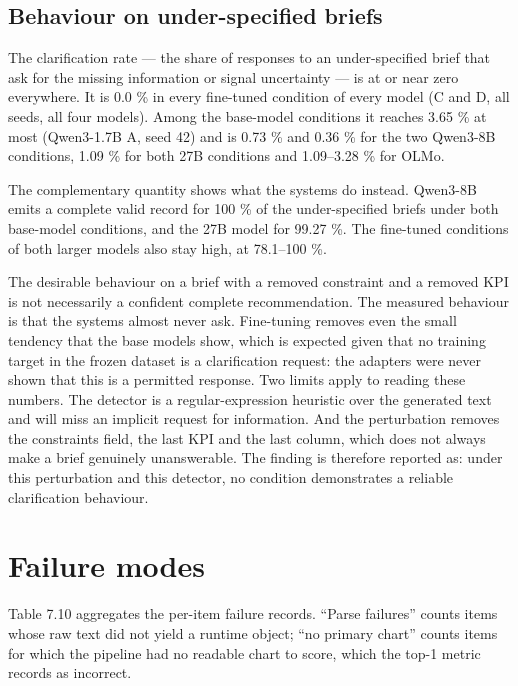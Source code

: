 \subsection{Behaviour on under-specified briefs}

The clarification rate --- the share of responses to an under-specified brief that ask for the missing information or signal uncertainty --- is at or near zero everywhere. It is 0.0 \% in every fine-tuned condition of every model (C and D, all seeds, all four models). Among the base-model conditions it reaches 3.65 \% at most (Qwen3-1.7B A, seed 42) and is 0.73 \% and 0.36 \% for the two Qwen3-8B conditions, 1.09 \% for both 27B conditions and 1.09--3.28 \% for OLMo.

The complementary quantity shows what the systems do instead. Qwen3-8B emits a complete valid record for 100 \% of the under-specified briefs under both base-model conditions, and the 27B model for 99.27 \%. The fine-tuned conditions of both larger models also stay high, at 78.1--100 \%.

The desirable behaviour on a brief with a removed constraint and a removed KPI is not necessarily a confident complete recommendation. The measured behaviour is that the systems almost never ask. Fine-tuning removes even the small tendency that the base models show, which is expected given that no training target in the frozen dataset is a clarification request: the adapters were never shown that this is a permitted response. Two limits apply to reading these numbers. The detector is a regular-expression heuristic over the generated text and will miss an implicit request for information. And the perturbation removes the constraints field, the last KPI and the last column, which does not always make a brief genuinely unanswerable. The finding is therefore reported as: under this perturbation and this detector, no condition demonstrates a reliable clarification behaviour.

\section{Failure modes}

Table 7.10 aggregates the per-item failure records. ``Parse failures'' counts items whose raw text did not yield a runtime object; ``no primary chart'' counts items for which the pipeline had no readable chart to score, which the top-1 metric records as incorrect.

